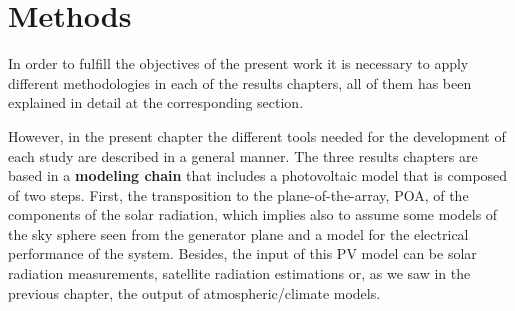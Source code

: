 
\chapter{Methods\label{cha:methods}}

In order to fulfill the objectives of the present work it is necessary to apply different methodologies in each of the results chapters, all of them has been explained in detail at the corresponding section. %

However, in the present chapter the different tools needed for the development of each study are described in a general manner. The three results chapters are based in a \textbf{modeling chain} that includes a photovoltaic model that is composed of two steps. First, the transposition to the plane-of-the-array, POA, of the components of the solar radiation, which implies also to assume some models of the sky sphere seen from the generator plane and a model for the electrical performance of the system. Besides, the input of this PV model can be solar radiation measurements, satellite radiation estimations or, as we saw in the previous chapter, the output of atmospheric/climate models. 


